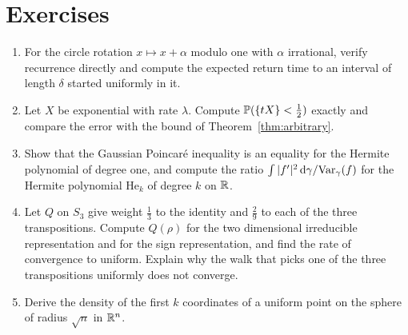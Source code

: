 \section*{Exercises}
\begin{enumerate}
\item For the circle rotation $x\mapsto x+\alpha$ modulo one with $\alpha$ irrational, verify recurrence directly and compute the expected return time to an interval of length $\delta$ started uniformly in it.
\item Let $X$ be exponential with rate $\lambda$. Compute $\P(\{tX\}<\frac12)$ exactly and compare the error with the bound of Theorem~\ref{thm:arbitrary}.
\item Show that the Gaussian Poincar\'e inequality is an equality for the Hermite polynomial of degree one, and compute the ratio $\int|f'|^2\dd\gamma/\Var_\gamma(f)$ for the Hermite polynomial $\mathrm{He}_k$ of degree $k$ on $\R$.
\item Let $Q$ on $S_3$ give weight $\frac13$ to the identity and $\frac29$ to each of the three transpositions. Compute $\hat Q(\rho)$ for the two dimensional irreducible representation and for the sign representation, and find the rate of convergence to uniform. Explain why the walk that picks one of the three transpositions uniformly does not converge.
\item Derive the density of the first $k$ coordinates of a uniform point on the sphere of radius $\sqrt n$ in $\R^n$.
\end{enumerate}
